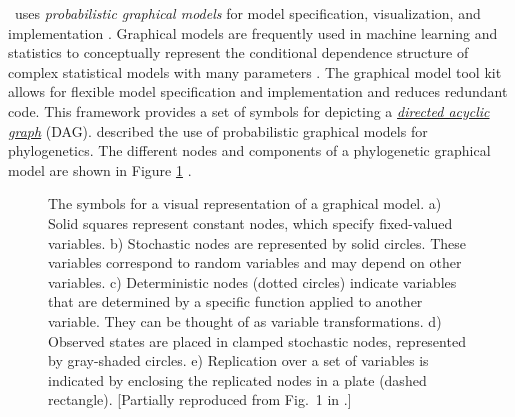 \RevBayes~uses \textit{probabilistic graphical models} for model specification, visualization, and implementation \citep{hoehnaGM2014}. 
Graphical models are frequently used in machine learning and statistics to conceptually represent the conditional dependence structure of complex statistical models with many parameters \citep{Gilks1994,lunn00,Jordan2004,Koller2009,Lunn2009}. 
The graphical model tool kit allows for flexible model specification and implementation and reduces redundant code. 
This framework provides a set of symbols for depicting a \href{http://en.wikipedia.org/wiki/Directed_acyclic_graph}{\textit{directed acyclic graph}} (DAG). 
\citet{hoehnaGM2014} described the use of probabilistic graphical models for phylogenetics. 
The different nodes and components of a phylogenetic graphical model are shown in Figure \ref{gmnotation} \citep[Fig. 1 from][]{hoehnaGM2014}. 
\begin{figure}[h!]
\centering
{}
\caption{\small The symbols for a visual representation of a graphical model. 
a) Solid squares represent constant nodes, which specify fixed-valued variables. 
b) Stochastic nodes are represented by solid circles. 
These variables correspond to random variables and may depend on other variables. 
c) Deterministic nodes (dotted circles) indicate variables that are determined by a specific function applied to another variable. 
They can be thought of as variable transformations. 
d) Observed states are placed in clamped stochastic nodes, represented by gray-shaded circles. e) Replication over a set of variables is indicated by enclosing the replicated nodes in a plate (dashed rectangle). 
[Partially reproduced from Fig.~1 in \citet{hoehnaGM2014}.]
}
\label{gmnotation}
\end{figure}

